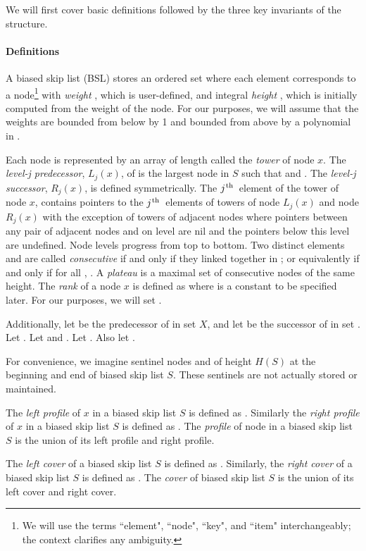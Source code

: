 \documentclass[11pt]{article}
\newcommand{\ens}[1]{\ensuremath{#1}}
\newcommand{\jth}{\ens{j^{\mbox{\hspace{.2mm}\scriptsize th}}}}
\newcommand{\intheight}[1]{\ensuremath{H(#1)}}
\newcommand{\node}[1]{\ensuremath{#1}}
\newcommand{\set}[1]{\ensuremath{#1}}
\newcommand{\bsl}[1]{\ensuremath{#1}}
\newcommand{\lvlpre}[2]{\ensuremath{L_{#1}(#2)}}
\newcommand{\lvlsuc}[2]{\ensuremath{R_{#1}(#2)}}
\begin{document}
 
We will first cover basic definitions followed by the three key invariants of the structure. 
 

\paragraph{Definitions} 
A biased skip list (BSL)  stores an ordered set  where each element  corresponds to a node\footnote{We will use the terms ``element", ``node", ``key", and ``item" interchangeably; the context clarifies any ambiguity.}  with \textit{weight} , which is user-defined, and integral \textit{height} , which is initially computed from the weight of the node. For our purposes, we will assume that the weights are bounded from below by 1 and bounded from above by a polynomial in . 

Each node  is represented by an array of length  called the \textit{tower} of node \node x. The \textit{level-j predecessor}, \lvlpre{j}{x}, of  is the largest node  in \bsl S such that  and . The \textit{level-j successor}, \lvlsuc{j}{x}, is defined symmetrically. The \jth\ element of the tower of node \node x, contains pointers to the \jth\ elements of towers of node \lvlpre{j}{x} and node \lvlsuc{j}{x} with the exception of towers of adjacent nodes where pointers between any pair of adjacent nodes  and  on level  are nil and the pointers below this level are undefined. Node levels progress from top to bottom. Two distinct elements  and  are called \textit{consecutive} if and only if they linked together in ; or equivalently if and only if for all , . A \textit{plateau} is a maximal set of consecutive nodes of the same height. The \textit{rank} of a node \node x is defined as  where  is a constant to be specified later. For our purposes, we will set . 

 
Additionally, let  be the predecessor of  in set \set X, and let  be the successor of  in set \set . Let . Let  and . Let . Also let .

For convenience, we imagine sentinel nodes  and  of height \intheight S at the beginning and end of biased skip list \bsl S. These sentinels are not actually stored or maintained. 

 The \textit{left profile} of \node x in a biased skip list \bsl S is defined as . Similarly the \textit{right profile} of \node x in a biased skip list \bsl S is defined as . The \textit{profile} of node  in a biased skip list \bsl S is the union of its left profile and right profile. 

 The \textit{left cover} of a biased skip list \bsl S is defined as . 
Similarly, the \textit{right cover} of a biased skip list \bsl S is defined as . 
The \textit{cover} of biased skip list \bsl S is the union of its left cover and right cover. 
 
\end{document}
